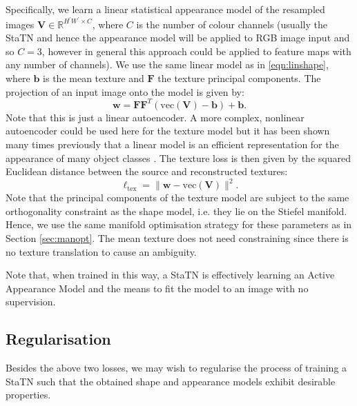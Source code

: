 \documentclass[runningheads]{llncs}
\newcommand{\R}{\mathbb{R}}
\begin{document}
Specifically, we learn a linear statistical appearance model of the resampled images $\mathbf{V}\in\R^{H^{\prime}W^{\prime}\times C}$, where $C$ is the number of colour channels (usually the StaTN and hence the appearance model will be applied to RGB image input and so $C=3$, however in general this approach could be applied to feature maps with any number of channels). We use the same linear model as in \eqref{eqn:linshape}, where $\mathbf{b}$ is the mean texture and $\mathbf{F}$ the texture principal components. The projection of an input image onto the model is given by:
\begin{equation}
    \mathbf{w} = \mathbf{F}\mathbf{F}^T(\textrm{vec}(\mathbf{V})-\mathbf{b})+\mathbf{b}.
\end{equation}
Note that this is just a linear autoencoder. A more complex, nonlinear autoencoder could be used here for the texture model but it has been shown many times previously that a linear model is an efficient representation for the appearance of many object classes \cite{cootes2001active}. The texture loss is then given by the squared Euclidean distance between the source and reconstructed textures:
\begin{equation}
    \ell_{\textrm{tex}} = \|\mathbf{w}-\textrm{vec}(\mathbf{V})\|^2.
\end{equation}
Note that the principal components of the texture model are subject to the same orthogonality constraint as the shape model, i.e. they lie on the Stiefel manifold. Hence, we use the same manifold optimisation strategy for these parameters as in Section \ref{sec:manopt}. The mean texture does not need constraining since there is no texture translation to cause an ambiguity.

Note that, when trained in this way, a StaTN is effectively learning an Active Appearance Model \cite{cootes2001active} and the means to fit the model to an image with no supervision.

\subsection{Regularisation}

Besides the above two losses, we may wish to regularise the process of training a StaTN such that the obtained shape and appearance models exhibit desirable properties.
\end{document}
